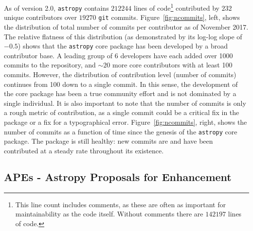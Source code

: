 \documentclass[modern]{aastex61}
\newcommand{\package}[1]{\texttt{#1}\xspace}
\newcommand{\astropypkg}{\package{astropy}}
\renewcommand{\figurename}{Figure\xspace}
\begin{document}
As of version 2.0, \astropypkg contains $212244$ lines of code\footnote{This
line count includes comments, as these are often as important for
maintainability as the code itself.  Without comments there are $142197$ lines
of code.} contributed by $232$ unique contributors over $19270$ \texttt{git}
commits.
\figurename~\ref{fig:ncommits}, left, shows the distribution of total number of
commits per contributor as of November 2017.
The relative flatness of this distribution (as demonstrated by its log-log slope of
$-0.5$) shows that the \astropypkg core package has been developed by a broad
contributor base.  A leading group of 6 developers have each added over 1000
commits to the repository, and $\sim 20$ more core contributors with at least
100 commits.
However, the distribution of contribution level (number of commits) continues
from 100 down to a single commit.
In this sense, the development of the core package has been a true community
effort and is not dominated by a single individual.
It is also important to note that the number of commits is only a rough metric
of contribution, as a single commit could be a critical fix in the package or a
fix for a typographical error.
\figurename~\ref{fig:ncommits}, right, shows the number of commits as a
function of time since the genesis of the \astropypkg core package.
The package is still healthy: new commits are and have been contributed at a
steady rate throughout its existence.

\subsection{APEs - Astropy Proposals for Enhancement}
\end{document}
